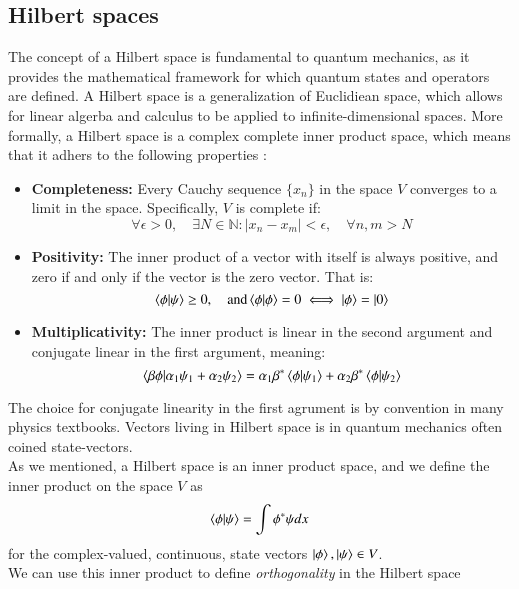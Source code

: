 \documentclass{subfiles}
\begin{document}
\subsection{Hilbert spaces}\label{sec:Hilbert_space}
The concept of a Hilbert space is fundamental to quantum mechanics, as it provides the mathematical framework for which quantum states and operators are defined. A Hilbert space is a generalization of Euclidiean space, which allows for linear algerba and calculus to be applied to infinite-dimensional spaces. More formally, a Hilbert space is a complex complete inner product space, which means that it adhers to the following properties \cite{griffiths2018introduction, berera2021quantum}: 
\begin{itemize}
    \item \textbf{Completeness:} Every Cauchy sequence $\{x_n\}$ in the space $V$ converges to a limit in the space. Specifically, $V$ is complete if:
    \begin{equation}
        \forall \epsilon > 0,\quad \exists N \in \mathbb{N} : |x_n - x_m| < \epsilon, \quad \forall n,m > N
    \end{equation}
    \item \textbf{Positivity:} The inner product of a vector with itself is always positive, and zero if and only if the vector is the zero vector. That is:
    \begin{equation}
        \braket{\phi|\psi}\geq 0, \quad \text{and} \braket{\phi|\phi} = 0 \iff \ket{\phi} = \ket{0} 
    \end{equation}
    \item \textbf{Multiplicativity:} The inner product is linear in the second argument and conjugate linear in the first argument, meaning:
    \begin{equation}
        \braket{\beta\phi|\alpha_1\psi_1 + \alpha_2\psi_2} = \alpha_1\beta^*\braket{\phi|\psi_1} + \alpha_2\beta^*\braket{\phi|\psi_2} 
    \end{equation}
\end{itemize}
The choice for conjugate linearity in the first agrument is by convention in many physics textbooks. Vectors living in Hilbert space is in quantum mechanics often coined state-vectors. \\ As we mentioned, a Hilbert space is an inner product space, and we define the inner product on the space $V$ as
\begin{align*}
    \braket{\phi|\psi} = \int \phi^* \psi dx
\end{align*}
for the complex-valued, continuous, state vectors $\ket{\phi}, \ket{\psi} \in V$. \\ We can use this inner product to define \emph{orthogonality} in the Hilbert space
\end{document}
